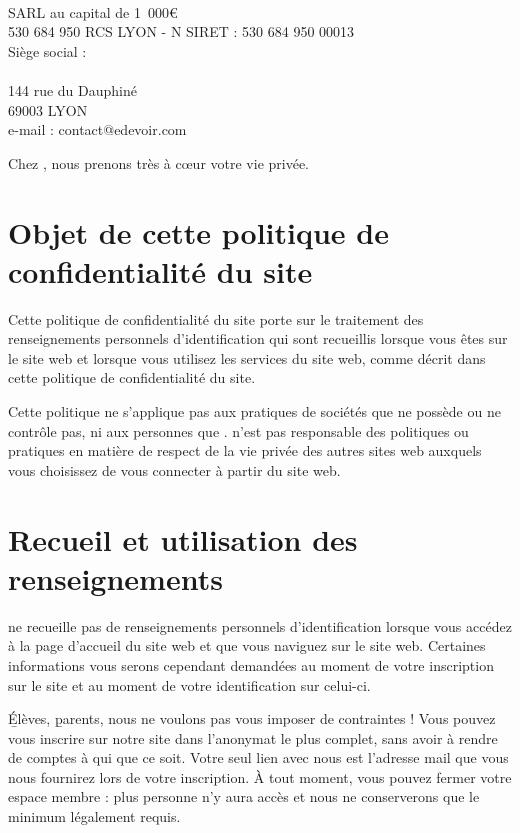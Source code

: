 \paragraph*{\eDevoir}
SARL au capital de 1~000\euro\\
530 684 950 RCS LYON - N SIRET : 530 684 950 00013\\
Siège social :\\
\eDevoir\\
144 rue du Dauphiné\\
69003 LYON\\
e-mail : contact@edevoir.com

Chez \eDevoir, nous prenons très à cœur votre vie privée.

\section{Objet de cette politique de confidentialité du site}

Cette politique de confidentialité du site porte sur le traitement des renseignements personnels d'identification qui sont recueillis lorsque vous êtes sur le site web et lorsque vous utilisez les services du site web, comme décrit dans cette politique de confidentialité du site.

Cette politique ne s'applique pas aux pratiques de sociétés que \eDevoir ne possède ou ne contrôle pas, ni aux personnes que \eDevoir. \eDevoir n'est pas responsable des politiques ou pratiques en matière de respect de la vie privée des autres sites web auxquels vous choisissez de vous connecter à partir du site web.

\section{Recueil et utilisation des renseignements}

\eDevoir ne recueille pas de renseignements personnels d'identification lorsque vous accédez à la page d'accueil du site web et que vous naviguez sur le site web. Certaines informations vous serons cependant demandées au moment de votre inscription sur le site et au moment de votre identification sur celui-ci.

\b{Élèves}, \b{parents}, nous ne voulons pas vous imposer de contraintes ! Vous pouvez vous inscrire sur notre site dans l'anonymat le plus complet, sans avoir à rendre de comptes à qui que ce soit. Votre seul lien avec nous est l'adresse mail que vous nous fournirez lors de votre inscription. À tout moment, vous pouvez fermer votre espace membre : plus personne n'y aura accès et nous ne conserverons que le minimum légalement requis.

